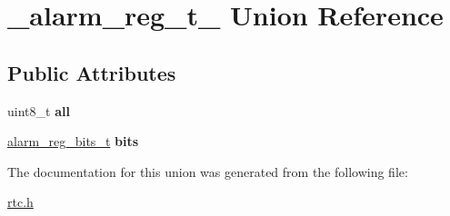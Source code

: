 \hypertarget{union__alarm__reg__t__}{}\section{\+\_\+alarm\+\_\+reg\+\_\+t\+\_\+ Union Reference}
\label{union__alarm__reg__t__}
\subsection*{Public Attributes}
\begin{DoxyCompactItemize}
\item 
\mbox{\label{union__alarm__reg__t___ab8b90dc6eebd036dfd7b0d9e0ae96e54}} 
uint8\+\_\+t {\bfseries all}
\item 
\mbox{\label{union__alarm__reg__t___a9995418689020385c436815392a316f6}} 
\hyperlink{struct__alarm__reg__bits__t__}{alarm\+\_\+reg\+\_\+bits\+\_\+t} {\bfseries bits}
\end{DoxyCompactItemize}


The documentation for this union was generated from the following file\+:\begin{DoxyCompactItemize}
\item 
\hyperlink{rtc_8h}{rtc.\+h}\end{DoxyCompactItemize}
